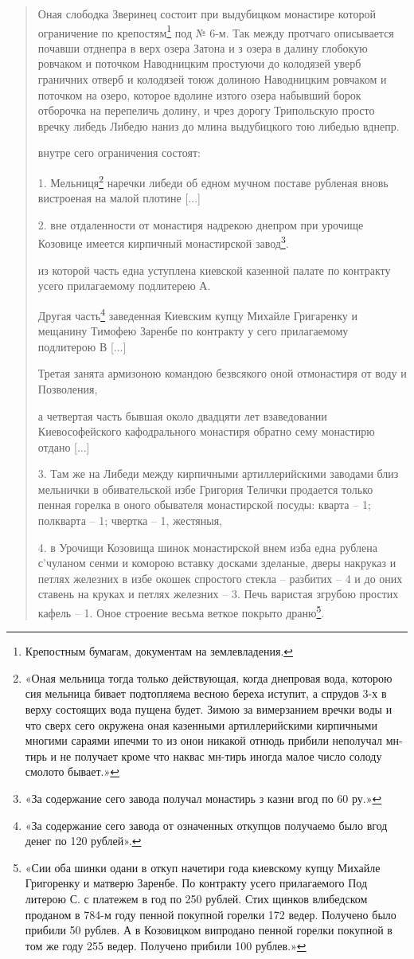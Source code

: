 \begin{quotation}
Оная слободка Зверинец состоит при выдубицком монастире которой ограничение по крепостям\footnote{Крепостным бумагам, документам на землевладения.} под № 6-м. Так между протчаго описывается почавши отднепра в верх озера Затона и з озера в далину глобокую ровчаком и поточком Наводницким простуючи до колодязей уверб граничних отверб и колодязей тоюж долиною Наводницким ровчаком и поточком на озеро, которое вдолине изтого озера набывший борок отборочка на перепеличь долину, и чрез дорогу Трипольскую просто вречку либедь Либедю наниз до млина выдубицкого тою либедью вднепр.

внутре сего ограничения состоят:

1. Мельниця\footnote{«Оная мельница тогда только действующая, когда днепровая вода, которою сия мельница бивает подтопляема весною береха иступит, а спрудов 3-х в верху состоящих вода пущена будет. Зимою за вимерзанием вречки воды и что сверх сего окружена оная казенными артиллерийскими кирпичными многими сараями ипечми то из онои никакой отнюдь прибили неполучал мн-тирь и не получает кроме что наквас мн-тирь иногда малое число солоду смолото бывает.»} наречки либеди об едном мучном поставе рубленая вновь вистроеная на малой плотине [...]

2. вне отдаленности от монастиря надрекою днепром при урочище Козовице имеется кирпичный монастирской завод\footnote{«За содержание сего завода получал монастирь з казни вгод по 60 ру.»}.

из которой часть една уступлена киевской казенной палате по контракту усего прилагаемому подлитерею А.

Другая часть\footnote{«За содержание сего завода от означенных откупцов получаемо было вгод денег по 120 рублей».} заведенная Киевским купцу Михайле Григаренку и мещанину Тимофею Заренбе по контракту у сего прилагаемому подлитерою В [...]

Третая занята армизоною командою безвсякого оной отмонастиря от воду и Позволения,

а четвертая часть бывшая около двадцяти лет взаведовании Киевософейского кафодрального монастиря обратно сему монастирю отдано [...]

3. Там же на Либеди между кирпичными артиллерийскими заводами близ мельнички в обивательской избе Григория Телички продается только пенная горелка в оного обывателя монастирской посуды: кварта – 1; полкварта – 1; чвертка – 1, жестяныя,

4. в Урочищи Козовища шинок монастирской внем изба една рублена с'чуланом сенми и коморою вставку досками зделаные, дверы накруказ и петлях железних в избе окошек спростого стекла – разбитих – 4 и до оних ставень на круках и петлях железних – 3. Печь варистая згрубою простих кафель – 1. Оное строение весьма веткое покрыто драню\footnote{«Сии оба шинки одани в откуп начетири года киевскому купцу Михайле Григоренку и матверю Заренбе. По контракту усего прилагаемого Под литерою С. с платежем в год по 250 рублей. Стих щинков влибедском проданом в 784-м году пенной покупной горелки 172 ведер. Получено было прибили 50 рублев. А в Козовицком випродано пенной горелки покупной в том же году 255 ведер. Получено прибили 100 рублев.»}.


\end{quotation}
